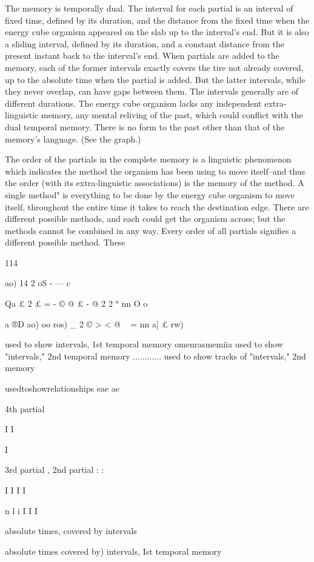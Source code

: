 \documentclass[10pt,twoside]{memoir}
\begin{document}
\begin{enumerate}
{\begin{enumerate}
\begin{sysrules}
\begin{sysrules}
\begin{sysrules}
\begin{sysrules}
{\begin{enumerate}
The memory is temporally dual. The interval for each partial is an 
interval of fixed time, defined by its duration, and the distance from the 
fixed time when the energy cube organism appeared on the slab up to the 
interval's end. But it is also a sliding interval, defined by its duration, and a 
constant distance from the present instant back to the interval's end. When 
partials are added to the memory, each of the former intervals exactly covers 
the tire not already covered, up to the absolute time when the partial is 
added. But the latter intervals, while they never overlap, can have gaps 
between them. The intervals generally are of different durations. The energy 
cube organism lacks any independent extra-linguistic memory, any mental 
reliving of the past, which could conflict with the dual temporal memory. 
There is no form to the past other than that of the memory's language. (See 
the graph.) 

The order of the partials in the complete memory is a linguistic 
phenomenon which indicates the method the organism has been using to 
move itself--and thus the order (with its extra-linguistic associations) is the 
memory of the method. A single method" is everything to be done by the 
energy cube organism to move itself, throughout the entire time it takes to 
reach the destination edge. There are different possible methods, and each 
could get the organism across; but the methods cannot be combined in any 
way. Every order of all partials signifies a different possible method. These 


114 


ao) 
14 
2 
oS 
- 
— 
c 

Qa 
£ 
2 
£ 
= 
- 
© 
@ 
£ 
- 
@ 
2 
2 
° 
nn 
O 
o 


a 
®D 
ao) 
oo 
ros) 
_ 
2 
© 
> 
< 
@ 
~ 
= 
nn 
a] 
£ 
rw) 


used to show intervals, 1st temporal memory omenrasmemiia 
used to show "intervals," 2nd temporal memory ............ 
used to show tracks of "intervals," 2nd memory 

usedtoshowrelationships eae ae 


4th partial 


I 
I 


I 

3rd partial 
, 2nd partial 
: : 

I I 
I I 


n 
l i 
I 
I I 


absolute times, covered by intervals 
{absolute times covered by) intervals, 
Ist temporal memory 


}
\end{enumerate}}
\end{sysrules}
\end{sysrules}
\end{sysrules}
\end{sysrules}
\end{enumerate}}
\end{enumerate}
\end{document}
